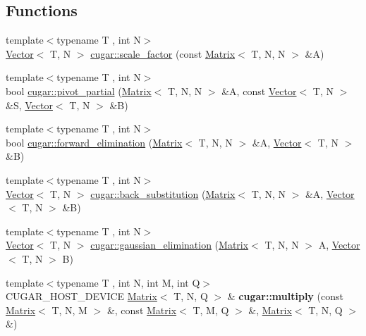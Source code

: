 \subsection*{Functions}
\begin{DoxyCompactItemize}
\item 
{\footnotesize template$<$typename T , int N$>$ }\\\hyperlink{structcugar_1_1_vector}{Vector}$<$ T, N $>$ \hyperlink{group___matrices_module_ga342b4467e7b63d9df5aa3697d7fd8abf}{cugar\+::scale\+\_\+factor} (const \hyperlink{structcugar_1_1_matrix}{Matrix}$<$ T, N, N $>$ \&A)
\item 
{\footnotesize template$<$typename T , int N$>$ }\\bool \hyperlink{group___matrices_module_ga20543c9a7231a795cec130ea267f8407}{cugar\+::pivot\+\_\+partial} (\hyperlink{structcugar_1_1_matrix}{Matrix}$<$ T, N, N $>$ \&A, const \hyperlink{structcugar_1_1_vector}{Vector}$<$ T, N $>$ \&S, \hyperlink{structcugar_1_1_vector}{Vector}$<$ T, N $>$ \&B)
\item 
{\footnotesize template$<$typename T , int N$>$ }\\bool \hyperlink{group___matrices_module_ga779124249c080805739c3c6332bef28c}{cugar\+::forward\+\_\+elimination} (\hyperlink{structcugar_1_1_matrix}{Matrix}$<$ T, N, N $>$ \&A, \hyperlink{structcugar_1_1_vector}{Vector}$<$ T, N $>$ \&B)
\item 
{\footnotesize template$<$typename T , int N$>$ }\\\hyperlink{structcugar_1_1_vector}{Vector}$<$ T, N $>$ \hyperlink{group___matrices_module_ga280d2a0c34c9e17d89b638d5b71102f1}{cugar\+::back\+\_\+substitution} (\hyperlink{structcugar_1_1_matrix}{Matrix}$<$ T, N, N $>$ \&A, \hyperlink{structcugar_1_1_vector}{Vector}$<$ T, N $>$ \&B)
\item 
{\footnotesize template$<$typename T , int N$>$ }\\\hyperlink{structcugar_1_1_vector}{Vector}$<$ T, N $>$ \hyperlink{group___matrices_module_ga00891ffdf015baf5d6f88d07319fe75f}{cugar\+::gaussian\+\_\+elimination} (\hyperlink{structcugar_1_1_matrix}{Matrix}$<$ T, N, N $>$ A, \hyperlink{structcugar_1_1_vector}{Vector}$<$ T, N $>$ B)
\item 
\mbox{\label{group___matrices_module_ga48f0107215240c3579c813366e68c3e0}} 
{\footnotesize template$<$typename T , int N, int M, int Q$>$ }\\C\+U\+G\+A\+R\+\_\+\+H\+O\+S\+T\+\_\+\+D\+E\+V\+I\+CE \hyperlink{structcugar_1_1_matrix}{Matrix}$<$ T, N, Q $>$ \& {\bfseries cugar\+::multiply} (const \hyperlink{structcugar_1_1_matrix}{Matrix}$<$ T, N, M $>$ \&, const \hyperlink{structcugar_1_1_matrix}{Matrix}$<$ T, M, Q $>$ \&, \hyperlink{structcugar_1_1_matrix}{Matrix}$<$ T, N, Q $>$ \&)

\end{DoxyCompactItemize}

